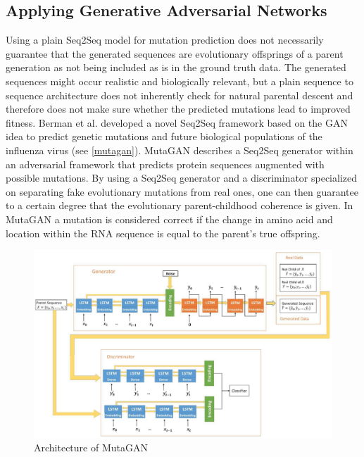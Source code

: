 \subsection{Applying Generative Adversarial Networks} \label{fundamentalsG}

Using a plain \ac{Seq2Seq} model for mutation prediction does not necessarily guarantee that the generated sequences are evolutionary offsprings of a parent generation as not being included as is in the ground truth data. The generated sequences might occur realistic and biologically relevant, but a plain sequence to sequence architecture does not inherently check for natural parental descent and therefore does not make sure whether the predicted mutations lead to improved fitness. Berman et al. \cite{Berman2020} developed a novel \ac{Seq2Seq} framework based on the \ac{GAN} idea to predict genetic mutations and future biological populations of the influenza virus (see \autoref{mutagan}). Muta\-GAN describes a \ac{Seq2Seq} generator within an adversarial framework that predicts protein sequences augmented with possible mutations. By using a \ac{Seq2Seq} generator and a discriminator specialized on separating fake evolutionary mutations from real ones, one can then guarantee to a certain degree that the evolutionary parent-childhood coherence is given. In MutaGAN a mutation is considered correct if the change in amino acid and location within the \ac{RNA} sequence is equal to the parent's true offspring. \cite{Berman2020}

\begin{figure}[ht]
	\centering
	\includegraphics[width=\linewidth]{figures/mutagan.png}
	\caption{Architecture of MutaGAN \cite{Berman2020}}
	\label{mutagan}
\end{figure}

